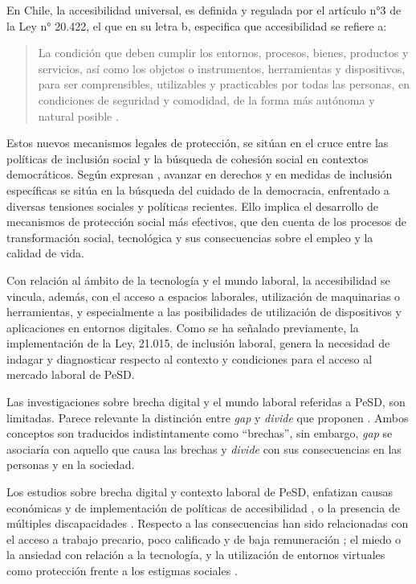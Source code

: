 En Chile, la accesibilidad universal, es definida y regulada por el
artículo n°3 de la Ley n° 20.422, el que en su letra b, especifica que
accesibilidad se refiere a:

\begin{quote}
	La condición que deben cumplir los entornos, procesos, bienes, productos
	y servicios, así como los objetos o instrumentos, herramientas y
	dispositivos, para ser comprensibles, utilizables y practicables por
	todas las personas, en condiciones de seguridad y comodidad, de la forma
	más autónoma y natural posible \cite{MINISTERIODEPLANIFICACION2010}.
\end{quote}

Estos nuevos mecanismos legales de protección, se sitúan en el cruce
entre las políticas de inclusión social y la búsqueda de cohesión social
en contextos democráticos. Según expresan \textcite{MALDONADO2020}, avanzar en derechos y en medidas de inclusión específicas se
sitúa en la búsqueda del cuidado de la democracia, enfrentado a diversas
tensiones sociales y políticas recientes. Ello implica el desarrollo de
mecanismos de protección social más efectivos, que den cuenta de los
procesos de transformación social, tecnológica y sus consecuencias sobre
el empleo y la calidad de vida.

Con relación al ámbito de la tecnología y el mundo laboral, la
accesibilidad se vincula, además, con el acceso a espacios laborales,
utilización de maquinarias o herramientas, y especialmente a las
posibilidades de utilización de dispositivos y aplicaciones en entornos
digitales. Como se ha señalado previamente, la implementación de la Ley,
21.015, de inclusión laboral, genera la necesidad de indagar y
diagnosticar respecto al contexto y condiciones para el acceso al
mercado laboral de PeSD.

Las investigaciones sobre brecha digital y el mundo laboral referidas a
PeSD, son limitadas. Parece relevante la distinción entre \emph{gap} y
\emph{divide} que proponen \textcite[p. 2]{LONGORIA2022}. Ambos conceptos son traducidos indistintamente como
\enquote{brechas}, sin embargo, \emph{gap} se asociaría con aquello que causa
las brechas y \emph{divide} con sus consecuencias en las personas y en
la sociedad.

Los estudios sobre brecha digital y contexto laboral de PeSD, enfatizan
causas económicas y de implementación de políticas de accesibilidad
\cite[p. 4440]{LIN2018}, o la presencia de múltiples
discapacidades \cite[p. 734]{SCANLAN2022}. Respecto a las consecuencias han
sido relacionadas con el acceso a trabajo precario, poco calificado y de
baja remuneración \cite[p. 726]{QU2022}; el miedo o la ansiedad con
relación a la tecnología, y la utilización de entornos virtuales como
protección frente a los estigmas sociales \cite[p. 2]{PETHIG2021}.


